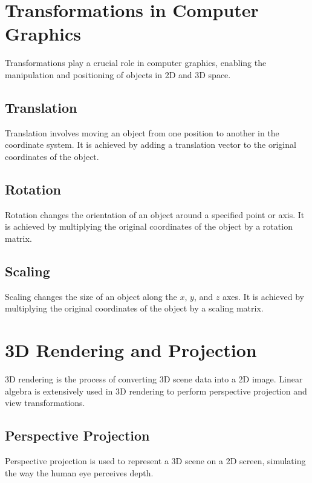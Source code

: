 \documentclass{article}
\begin{document}
\section{Transformations in Computer Graphics}
Transformations play a crucial role in computer graphics, enabling the manipulation and positioning of objects in 2D and 3D space.

\subsection{Translation}
Translation involves moving an object from one position to another in the coordinate system. It is achieved by adding a translation vector to the original coordinates of the object.

\subsection{Rotation}
Rotation changes the orientation of an object around a specified point or axis. It is achieved by multiplying the original coordinates of the object by a rotation matrix.

\subsection{Scaling}
Scaling changes the size of an object along the $x$, $y$, and $z$ axes. It is achieved by multiplying the original coordinates of the object by a scaling matrix.

\section{3D Rendering and Projection}
3D rendering is the process of converting 3D scene data into a 2D image. Linear algebra is extensively used in 3D rendering to perform perspective projection and view transformations.

\subsection{Perspective Projection}
Perspective projection is used to represent a 3D scene on a 2D screen, simulating the way the human eye perceives depth.

\begin{center}
\end{center}
\end{document}
